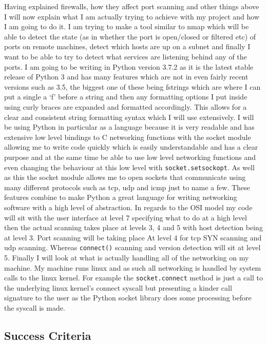 \documentclass[titlepage]{article}
\let\Oldsubsection\subsection{}
\renewcommand{\subsection}{\FloatBarrier\Oldsubsection}
\begin{document}
Having explained firewalls, how they affect port scanning and other things above I will now explain 
what I am actually trying to achieve with my project and how I am going to do it. I am trying to 
make a tool similar to nmap which will be able to detect the state (as in whether the port is 
open/closed or filtered etc) of ports on remote machines, detect which hosts are up on a subnet and 
finally I want to be able to try to detect what services are listening behind any of the ports. I am 
going to be writing in Python version 3.7.2 as it is the latest stable release of Python 3 and has 
many features which are not in even fairly recent versions such as 3.5, the biggest one of these 
being fstrings which are where I can put a single a `f' before a string and then any formatting 
options I put inside using curly braces are expanded and formatted accordingly. This allows for a 
clear and consistent string formatting syntax which I will use extensively. I will be using Python 
in particular as a language because it is very readable and has extensive low level bindings to C 
networking functions with the socket module allowing me to write code quickly which is easily 
understandable and has a clear purpose and at the same time be able to use low level networking 
functions and even changing the behaviour at this low level with \verb|socket.setsockopt|. As well 
as this the socket module allows me to open sockets that communicate using many different protocols 
such as \gls{tcp}, \gls{udp} and \gls{icmp} just to name a few. These features combine to make 
Python a great language for writing networking software with a high level of abstraction. In regards 
to the OSI model my code will sit with the user interface at level 7 specifying what to do at a high 
level then the actual scanning takes place at levels 3, 4 and 5 with host detection being at level 
3. Port scanning will be taking place At level 4 for \gls{tcp} SYN scanning and \gls{udp} scanning. 
Whereas \verb|connect()| scanning and version detection will sit at level 5. Finally I will look at 
what is actually handling all of the networking on my machine. My machine runs linux and as such all 
networking is handled by system calls to the linux kernel. For example the \verb|socket.connect| 
method is just a call to the underlying linux kernel's connect syscall but presenting a kinder call 
signature to the user as the Python socket library does some processing before the syscall is made. 

\subsection{Success Criteria}
\end{document}
